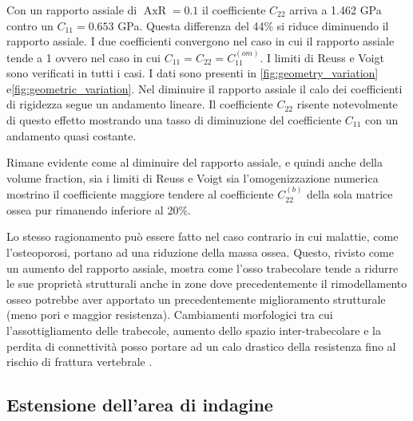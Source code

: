 \documentclass[a4paper,num-refs]{oup-contemporary}
\begin{document}
Con un rapporto assiale di $\operatorname{AxR}=0.1$ il coefficiente $C_{22}$ arriva a 1.462 GPa contro un $C_{11}=0.653$ GPa. Questa differenza del 44\% si riduce diminuendo il rapporto assiale. I due coefficienti convergono nel caso in cui il rapporto assiale tende a 1 ovvero nel caso in cui $C_{11}=C_{22}=C_{11}^{(om)}$. I limiti di Reuss e Voigt sono verificati in tutti i casi. I dati sono presenti in \cref{fig:geometry_variation} e\cref{fig:geometric_variation}. Nel diminuire il rapporto assiale il calo dei coefficienti di rigidezza segue un andamento lineare. Il coefficiente $C_{22}$ risente notevolmente di questo effetto mostrando una tasso di diminuzione del coefficiente $C_{11}$ con un andamento quasi costante. 

Rimane evidente come al diminuire del rapporto assiale, e quindi anche della volume fraction, sia i limiti di Reuss e Voigt sia l'omogenizzazione numerica mostrino il coefficiente maggiore tendere al coefficiente $C_{22}^{(b)}$ della sola matrice ossea pur rimanendo inferiore al 20\%.  

Lo stesso ragionamento può essere fatto nel caso contrario in cui malattie, come l'osteoporosi, portano ad una riduzione della massa ossea. Questo, rivisto come un aumento del rapporto assiale, mostra come l'osso trabecolare tende a ridurre le sue proprietà strutturali anche in zone dove precedentemente il rimodellamento osseo potrebbe aver apportato un precedentemente miglioramento strutturale (meno pori e maggior resistenza). Cambiamenti morfologici tra cui l'assottigliamento delle trabecole, aumento dello spazio inter-trabecolare e la perdita di connettività posso portare ad un calo drastico della resistenza fino al rischio di frattura vertebrale \citep{Ferguson:2003}.







\subsection{Estensione dell'area di indagine}
\label{sec:estensione}
\end{document}
